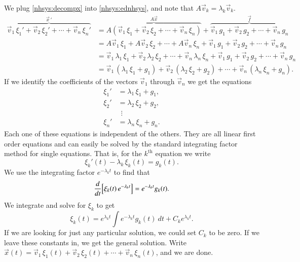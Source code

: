 \documentclass[12pt]{book}
\begin{document}
We plug \eqref{nhsys:decompx} into \eqref{nhsys:ednhsys}, and note that
$A \vec{v}_k = \lambda_k \vec{v}_k$.
\begin{equation*}
\begin{split}
\overbrace{
\vec{v}_1 \, \xi_1' + 
\vec{v}_2 \, \xi_2' + \cdots +
\vec{v}_n \, \xi_n'
}^{{\vec{x}\,}'}
& =
\overbrace{
A \left( \vec{v}_1 \, \xi_1 + 
\vec{v}_2 \, \xi_2 + \cdots +
\vec{v}_n \, \xi_n \right)
}^{A\vec{x}}
+
\overbrace{
\vec{v}_1 \, g_1 + 
\vec{v}_2 \, g_2 + \cdots +
\vec{v}_n \, g_n
}^{\vec{f}}
\\
& = 
A \vec{v}_1 \, \xi_1 + 
A \vec{v}_2 \, \xi_2 + \cdots +
A \vec{v}_n \, \xi_n
+
\vec{v}_1 \, g_1 + 
\vec{v}_2 \, g_2 + \cdots +
\vec{v}_n \, g_n
\\
& =
\vec{v}_1 \, \lambda_1 \, \xi_1 + 
\vec{v}_2 \, \lambda_2 \, \xi_2 + \cdots +
\vec{v}_n \, \lambda_n \, \xi_n
+
\vec{v}_1 \, g_1 + 
\vec{v}_2 \, g_2 + \cdots +
\vec{v}_n \, g_n
\\
& =
\vec{v}_1 \, ( \lambda_1 \, \xi_1 + g_1 ) +
\vec{v}_2 \, ( \lambda_2 \, \xi_2 + g_2 ) + \cdots + 
\vec{v}_n \, ( \lambda_n \, \xi_n + g_n ) .
\end{split}
\end{equation*}
If we identify the coefficients of the vectors $\vec{v}_1$ through
$\vec{v}_n$ we get the
equations
\begin{align*}
\xi_1' & = \lambda_1 \, \xi_1 + g_1 , \\
\xi_2' & = \lambda_2 \, \xi_2 + g_2 , \\
& ~~ \vdots \\
\xi_n' & = \lambda_n \, \xi_n + g_n .
\end{align*}
Each one of these equations is independent of the others.  They are all
linear first order equations and can easily be solved by the standard
integrating factor method for single equations.
That is, for the $k^{\text{th}}$
equation we write
\begin{equation*}
\xi_k'(t) - \lambda_k \, \xi_k(t) = g_k(t) .
\end{equation*}
We use the integrating factor $e^{-\lambda_k t}$ to find that
\begin{equation*}
\frac{d}{dt}\Bigl[ \xi_k(t) \, e^{-\lambda_k t} \Bigr] = 
e^{-\lambda_k t} g_k(t) .
\end{equation*}
We integrate and solve for $\xi_k$ to get
\begin{equation*}
\xi_k(t) =  e^{\lambda_k t} 
\int e^{-\lambda_k t} g_k(t) ~dt + C_k e^{\lambda_k t} .
\end{equation*}
If we are looking for just any particular solution, we could set
$C_k$ to be zero.  If we leave these constants in, we get the
general solution.  Write
$\vec{x}(t) =
\vec{v}_1 \, \xi_1(t) + 
\vec{v}_2 \, \xi_2(t) + \cdots +
\vec{v}_n \, \xi_n(t)$, and we are done.
\end{document}
